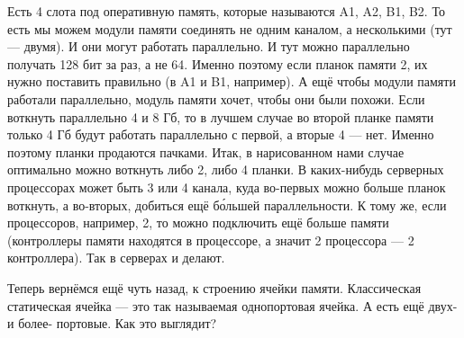 \documentclass{article}
\begin{document}
    Есть 4 слота под оперативную память, которые называются A1, A2, B1, B2. То есть мы можем модули памяти соединять не одним каналом, а несколькими (тут --- двумя). И они могут работать параллельно. И тут можно параллельно получать 128 бит за раз, а не 64. Именно поэтому если планок памяти 2, их нужно поставить правильно (в A1 и B1, например). А ещё чтобы модули памяти работали параллельно, модуль памяти хочет, чтобы они были похожи. Если воткнуть параллельно 4 и 8 Гб, то в лучшем случае во второй планке памяти только 4 Гб будут работать параллельно с первой, а вторые 4 --- нет. Именно поэтому планки продаются пачками. Итак, в нарисованном нами случае оптимально можно воткнуть либо 2, либо 4 планки. В каких-нибудь серверных процессорах может быть 3 или 4 канала, куда во-первых можно больше планок воткнуть, а во-вторых, добиться ещё б\'{о}льшей параллельности. К тому же, если процессоров, например, 2, то можно подключить ещё больше памяти (контроллеры памяти находятся в процессоре, а значит 2 процессора --- 2 контроллера). Так в серверах и делают.
    \begin{center}
    \end{center}
    Теперь вернёмся ещё чуть назад, к строению ячейки памяти. Классическая статическая ячейка --- это так называемая однопортовая ячейка. А есть ещё двух- и более- портовые. Как это выглядит?
\end{document}
